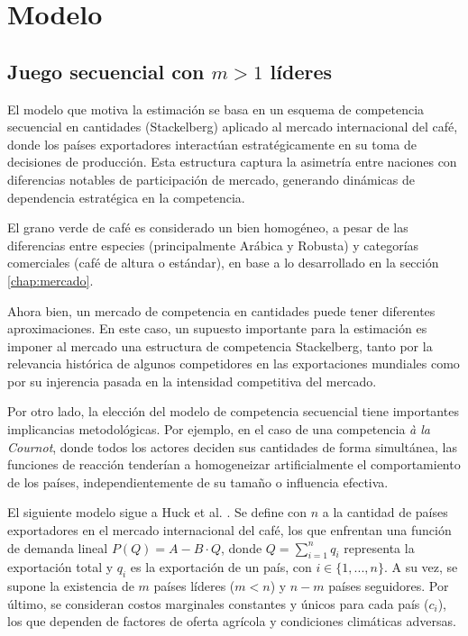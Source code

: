 \chapter{Modelo}
\label{chap:modelo}

\section{Juego secuencial con $m > 1$ líderes}

El modelo que motiva la estimación se basa en un esquema de competencia secuencial en cantidades (Stackelberg) aplicado al mercado internacional del café, donde los países exportadores interactúan estratégicamente en su toma de decisiones de producción. Esta estructura captura la asimetría entre naciones con diferencias notables de participación de mercado, generando dinámicas de dependencia estratégica en la competencia.

El grano verde de café es considerado un bien homogéneo, a pesar de las diferencias entre especies (principalmente Arábica y Robusta) y categorías comerciales (café de altura o estándar), en base a lo desarrollado en la sección \ref{chap:mercado}.

Ahora bien, un mercado de competencia en cantidades puede tener diferentes aproximaciones. En este caso, un supuesto importante para la estimación es imponer al mercado una estructura de competencia Stackelberg, tanto por la relevancia histórica de algunos competidores en las exportaciones mundiales como por su injerencia pasada en la intensidad competitiva del mercado.

Por otro lado, la elección del modelo de competencia secuencial tiene importantes implicancias metodológicas. Por ejemplo, en el caso de una competencia \textit{à la Cournot}, donde todos los actores deciden sus cantidades de forma simultánea, las funciones de reacción tenderían a homogeneizar artificialmente el comportamiento de los países, independientemente de su tamaño o influencia efectiva.

El siguiente modelo sigue a Huck et al. \citeyearpar{huck2001}. Se define con $n$ a la cantidad de países exportadores en el mercado internacional del café, los que enfrentan una función de demanda lineal $P(Q)=A-B\cdot Q$, donde $Q=\sum_{i=1}^{n}q_{i}$ representa la exportación total y $q_{i}$ es la exportación de un país, con $i \in \{1, ..., n\}$. A su vez, se supone la existencia de $m$ países líderes ($m<n$) y $n-m$ países seguidores. Por último, se consideran costos marginales constantes y únicos para cada país ($c_{i}$), los que dependen de factores de oferta agrícola y condiciones climáticas adversas.

